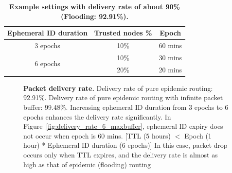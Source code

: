 \documentclass[11pt]{article}
\begin{document}
\begin{table}[!h]
\center
\begin{tabular}[!h]{|c|c|c|}
\hline
Ephemeral ID duration	& Trusted nodes \%	& Epoch	\\	
\hline
\hline
3 epochs				& 10\%				& 60 mins	\\
\hline
\multirow{2}{*}{6 epochs}	& 10\%			& 30 mins \\
							& 20\%			& 20 mins \\
\hline
\end{tabular}
\vspace{10pt}
\caption{{ \bf Example settings with delivery rate of about 90\% (Flooding: 92.91\%).}}
\label{tab:dataset_summary}
\end{table}




\begin{figure}[h!]
\center
{}
{}
{}
\caption{{\bf Packet delivery rate.} 
Delivery rate of pure epidemic routing: 92.91\%.  
Delivery rate of pure epidemic routing with infinite packet buffer: 99.48\%.
Increasing ephemeral ID duration from 3 epochs to 6 epochs enhances the delivery rate significantly. 
In Figure~\ref{fig:delivery_rate_6_maxbuffer}, ephemeral ID expiry does not occur when epoch is 60 mins. 
[TTL (5 hours) $<$ Epoch (1 hour) * Ephemeral ID duration (6 epochs)]
In this case, packet drop occurs only when TTL expires, and the delivery rate is almost as high as that of epidemic (flooding) routing 
}
\label{fig:delivery_rate}
\end{figure}
\end{document}
